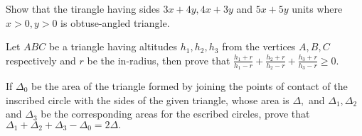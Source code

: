 \item Show that the tirangle having sides $3x + 4y, 4x + 3y$ and $5x + 5y$ units where $x > 0, y > 0$ is
   obtuse-angled triangle.

\item Let $ABC$ be a triangle having altitudes $h_1, h_2, h_3$ from the vertices $A, B, C$ respectively and
   $r$ be the in-radius, then prove that $\frac{h_1 + r}{h_1 - r} + \frac{h_2 + r}{h_2 - r} + \frac{h_3 + r}{h_3 -
   r}\geq 0.$

\item If $\Delta_0$ be the area of the triangle formed by joining the points of contact of the inscribed circle with the sides
   of the given triangle, whose area is $\Delta,$ and $\Delta_1, \Delta_2$ and $\Delta_3$ be the corresponding
   areas for the escribed circles, prove that $\Delta_1 + \Delta_2 + \Delta_3 - \Delta_0 = 2\Delta.$
 \stopitemize
